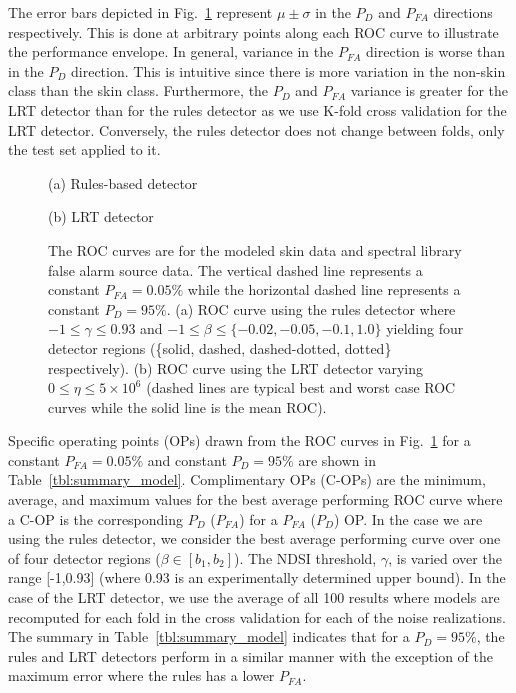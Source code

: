 \documentclass[10pt,journal,cspaper,compsoc]{IEEEtran}
\begin{document}
The error bars depicted in Fig.~\ref{fig:detection_model} represent $\mu \pm \sigma$ in the $P_D$ 
and $P_{FA}$ directions respectively.  This is done at arbitrary points along each ROC curve to illustrate the 
performance envelope.  In general, variance in the $P_{FA}$ direction is worse than in the $P_D$ direction.  This 
is intuitive since there is more variation in the non-skin class than the skin class. Furthermore, the $P_D$ and 
$P_{FA}$ variance is greater for the LRT detector than for the rules detector as we use K-fold cross 
validation for the LRT detector.  Conversely, the rules detector does not change between folds, only 
the test set applied to it.

\begin{figure}
\begin{minipage}[b]{0.48\linewidth}
  \centering
 \centerline{}
  \centerline{(a) Rules-based detector}\medskip
\end{minipage}
\hfill
\begin{minipage}[b]{0.48\linewidth}
  \centering
 \centerline{}
  \centerline{(b) LRT detector}\medskip
\end{minipage}
\vspace{-0.5cm}
\caption{The ROC curves are for the modeled skin data and spectral library false alarm source data. 
The vertical dashed line represents a constant $P_{FA}=0.05\%$ while the horizontal dashed line 
represents a constant $P_D=95\%$.
(a) ROC curve using the rules detector where $-1 \leq \gamma \leq 0.93$ and  
$-1 \leq \beta \leq\{-0.02,-0.05,-0.1,1.0\}$ yielding four detector regions (\{solid, dashed, dashed-dotted, dotted\} respectively).
(b) ROC curve using the LRT detector varying $ 0 \leq \eta \leq 5\times10^6$
(dashed lines are typical best and worst case ROC curves while the solid line is the mean ROC).}
\label{fig:detection_model}
\end{figure}

Specific operating points (OPs) drawn from the ROC curves in Fig.~\ref{fig:detection_model} for
a constant $P_{FA}=0.05\%$ and constant $P_D=95\%$ are shown in Table~\ref{tbl:summary_model}.
Complimentary OPs (C-OPs) are the minimum, average, and maximum values for the best average 
performing ROC curve where a C-OP is the corresponding $P_D$ ($P_{FA}$) for a $P_{FA}$ ($P_D$) OP.  
In the case we are using the rules detector, we 
consider the best average performing curve over one of four detector regions ($\beta\in[b_1,b_2]$). 
The NDSI threshold, $\gamma$, is varied over the range [-1,0.93] (where 0.93 is an experimentally 
determined upper bound).  In the case of the LRT detector, we use the average of all 100 results 
where models are recomputed for each fold in the cross validation for each of the noise realizations.
The summary in Table~\ref{tbl:summary_model} indicates that for a $P_D=95\%$, the rules and 
LRT detectors perform in a similar manner with the exception of the maximum error where the 
rules has a lower $P_{FA}$.
\end{document}
